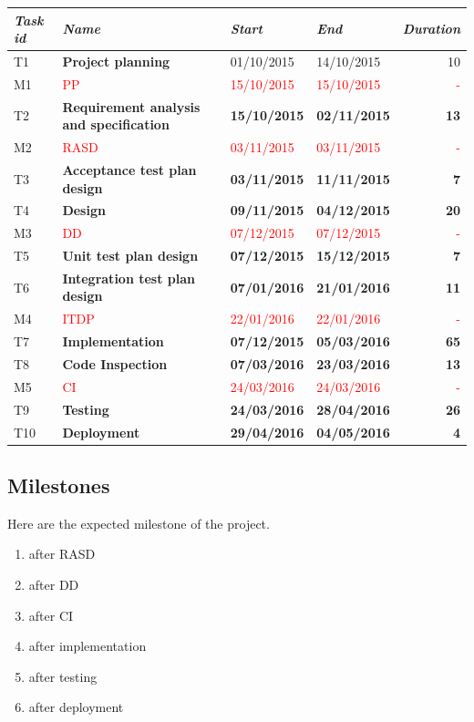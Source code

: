 \noindent \begin{center}
\begin{tabular}{l|>{\raggedright}p{4cm}|l|l|r}
\hline 
\emph{Task id} & \emph{Name} & \emph{Start} & \emph{End} & \emph{Duration}\tabularnewline
\hline 
\hline 
T1 & \textbf{Project planning} & 01/10/2015 & 14/10/2015 & 10\tabularnewline
\hline 
M1 & \textcolor{red}{PP} & \textcolor{red}{15/10/2015} & \textcolor{red}{15/10/2015} & \textcolor{red}{-}\tabularnewline
\hline 
T2 & \textbf{Requirement analysis and specification} & \textbf{15/10/2015} & \textbf{02/11/2015} & \textbf{13}\tabularnewline
\hline 
M2 & \textcolor{red}{RASD} & \textcolor{red}{03/11/2015} & \textcolor{red}{03/11/2015} & \textcolor{red}{-}\tabularnewline
\hline 
T3 & \textbf{Acceptance test plan design} & \textbf{03/11/2015} & \textbf{11/11/2015} & \textbf{7}\tabularnewline
\hline 
T4 & \textbf{Design} & \textbf{09/11/2015} & \textbf{04/12/2015} & \textbf{20}\tabularnewline
\hline 
M3 & \textcolor{red}{DD} & \textcolor{red}{07/12/2015} & \textcolor{red}{07/12/2015} & \textcolor{red}{-}\tabularnewline
\hline 
T5 & \textbf{Unit test plan design} & \textbf{07/12/2015} & \textbf{15/12/2015} & \textbf{7}\tabularnewline
\hline 
T6 & \textbf{Integration test plan design} & \textbf{07/01/2016} & \textbf{21/01/2016} & \textbf{11}\tabularnewline
\hline 
M4 & \textcolor{red}{ITDP} & \textcolor{red}{22/01/2016} & \textcolor{red}{22/01/2016} & \textcolor{red}{-}\tabularnewline
\hline 
T7 & \textbf{Implementation} & \textbf{07/12/2015} & \textbf{05/03/2016} & \textbf{65}\tabularnewline
\hline 
T8 & \textbf{Code Inspection} & \textbf{07/03/2016} & \textbf{23/03/2016} & \textbf{13}\tabularnewline
\hline 
M5 & \textcolor{red}{CI} & \textcolor{red}{24/03/2016} & \textcolor{red}{24/03/2016} & \textcolor{red}{-}\tabularnewline
\hline 
T9 & \textbf{Testing} & \textbf{24/03/2016} & \textbf{28/04/2016} & \textbf{26}\tabularnewline
\hline 
T10 & \textbf{Deployment} & \textbf{29/04/2016} & \textbf{04/05/2016} & \textbf{4}\tabularnewline
\hline 
\end{tabular}
\par\end{center}


\subsection{Milestones}

Here are the expected milestone of the project.
\begin{enumerate}
\item after RASD
\item after DD
\item after CI
\item after implementation
\item after testing
\item after deployment
\end{enumerate}

